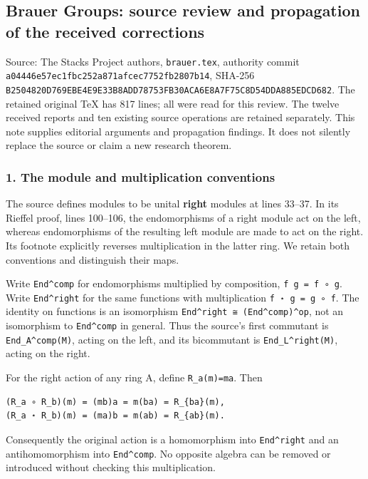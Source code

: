 \subsection{Brauer Groups: source review and propagation of the received corrections}\label{brauer-groups-source-review-and-propagation-of-the-received-corrections}

Source: The Stacks Project authors, \texttt{brauer.tex}, authority commit \texttt{a04446e57ec1fbc252a871afcec7752fb2807b14}, SHA-256 \texttt{B2504820D769EBE4E9E33B8ADD78753FB30ACA6E8A7F75C8D54DDA885EDCD682}. The retained original TeX has 817 lines; all were read for this review. The twelve received reports and ten existing source operations are retained separately. This note supplies editorial arguments and propagation findings. It does not silently replace the source or claim a new research theorem.

\subsubsection{1. The module and multiplication conventions}\label{the-module-and-multiplication-conventions}

The source defines modules to be unital \textbf{right} modules at lines 33--37. In its Rieffel proof, lines 100--106, the endomorphisms of a right module act on the left, whereas endomorphisms of the resulting left module are made to act on the right. Its footnote explicitly reverses multiplication in the latter ring. We retain both conventions and distinguish their maps.

Write \texttt{End\^{}comp} for endomorphisms multiplied by composition, \texttt{f\ g\ =\ f\ ∘\ g}. Write \texttt{End\^{}right} for the same functions with multiplication \texttt{f\ ⋆\ g\ =\ g\ ∘\ f}. The identity on functions is an isomorphism \texttt{End\^{}right\ ≅\ (End\^{}comp)\^{}op}, not an isomorphism to \texttt{End\^{}comp} in general. Thus the source's first commutant is \texttt{End\_A\^{}comp(M)}, acting on the left, and its bicommutant is \texttt{End\_L\^{}right(M)}, acting on the right.

For the right action of any ring A, define \texttt{R\_a(m)=ma}. Then

\begin{verbatim}
(R_a ∘ R_b)(m) = (mb)a = m(ba) = R_{ba}(m),
(R_a ⋆ R_b)(m) = (ma)b = m(ab) = R_{ab}(m).
\end{verbatim}

Consequently the original action is a homomorphism into \texttt{End\^{}right} and an antihomomorphism into \texttt{End\^{}comp}. No opposite algebra can be removed or introduced without checking this multiplication.

